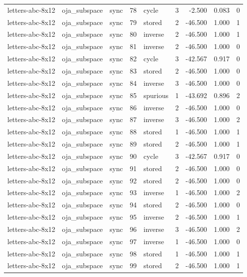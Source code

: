\begin{tabular}{lllrlrrrr}
letters-abc-8x12 & oja\_subspace & sync & 78 & cycle & 3 & -2.500 & 0.083 & 0 \\
letters-abc-8x12 & oja\_subspace & sync & 79 & stored & 2 & -46.500 & 1.000 & 1 \\
letters-abc-8x12 & oja\_subspace & sync & 80 & inverse & 2 & -46.500 & 1.000 & 1 \\
letters-abc-8x12 & oja\_subspace & sync & 81 & inverse & 2 & -46.500 & 1.000 & 0 \\
letters-abc-8x12 & oja\_subspace & sync & 82 & cycle & 3 & -42.567 & 0.917 & 0 \\
letters-abc-8x12 & oja\_subspace & sync & 83 & stored & 2 & -46.500 & 1.000 & 0 \\
letters-abc-8x12 & oja\_subspace & sync & 84 & inverse & 3 & -46.500 & 1.000 & 0 \\
letters-abc-8x12 & oja\_subspace & sync & 85 & spurious & 1 & -43.692 & 0.896 & 2 \\
letters-abc-8x12 & oja\_subspace & sync & 86 & inverse & 2 & -46.500 & 1.000 & 0 \\
letters-abc-8x12 & oja\_subspace & sync & 87 & inverse & 3 & -46.500 & 1.000 & 2 \\
letters-abc-8x12 & oja\_subspace & sync & 88 & stored & 1 & -46.500 & 1.000 & 1 \\
letters-abc-8x12 & oja\_subspace & sync & 89 & stored & 2 & -46.500 & 1.000 & 1 \\
letters-abc-8x12 & oja\_subspace & sync & 90 & cycle & 3 & -42.567 & 0.917 & 0 \\
letters-abc-8x12 & oja\_subspace & sync & 91 & stored & 2 & -46.500 & 1.000 & 0 \\
letters-abc-8x12 & oja\_subspace & sync & 92 & stored & 2 & -46.500 & 1.000 & 0 \\
letters-abc-8x12 & oja\_subspace & sync & 93 & inverse & 1 & -46.500 & 1.000 & 2 \\
letters-abc-8x12 & oja\_subspace & sync & 94 & stored & 2 & -46.500 & 1.000 & 0 \\
letters-abc-8x12 & oja\_subspace & sync & 95 & inverse & 2 & -46.500 & 1.000 & 1 \\
letters-abc-8x12 & oja\_subspace & sync & 96 & inverse & 3 & -46.500 & 1.000 & 2 \\
letters-abc-8x12 & oja\_subspace & sync & 97 & inverse & 1 & -46.500 & 1.000 & 0 \\
letters-abc-8x12 & oja\_subspace & sync & 98 & stored & 1 & -46.500 & 1.000 & 1 \\
letters-abc-8x12 & oja\_subspace & sync & 99 & stored & 2 & -46.500 & 1.000 & 1 \\

\end{tabular}
